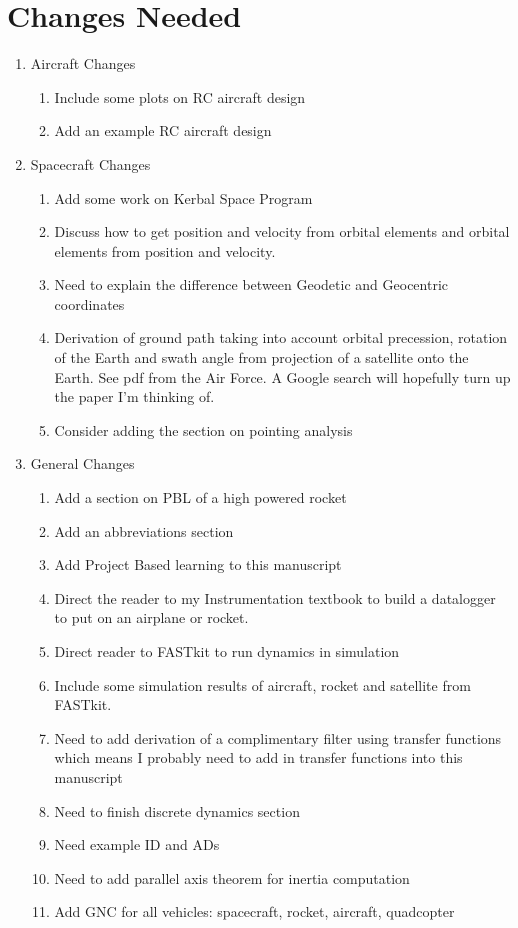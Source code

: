 \section*{Changes Needed}

\begin{enumerate}[itemsep=-5pt]
  \item Aircraft Changes
    \begin{enumerate}[itemsep=-5pt]
    \item Include some plots on RC aircraft design
    \item Add an example RC aircraft design
    \end{enumerate}
\item Spacecraft Changes
  \begin{enumerate}[itemsep=-5pt]
  \item Add some work on Kerbal Space Program
  \item Discuss how to get position and velocity from orbital elements and orbital elements
    from position and velocity.
  \item Need to explain the difference between Geodetic and Geocentric
    coordinates
  \item Derivation of ground path taking into account orbital
    precession, rotation of the Earth and swath angle from projection of
    a satellite onto the Earth. See pdf from the Air Force. A Google
    search will hopefully turn up the paper I'm thinking of.
  \item Consider adding the section on pointing analysis
  \end{enumerate}
\item General Changes
  \begin{enumerate}[itemsep=-5pt]
  \item Add a section on PBL of a high powered rocket
  \item Add an abbreviations section
  \item Add Project Based learning to this manuscript
  \item Direct the reader to my Instrumentation textbook to build a
    datalogger to put on an airplane or rocket.
  \item Direct reader to FASTkit to run dynamics in simulation
  \item Include some simulation results of aircraft, rocket and
    satellite from FASTkit.
  \item Need to add derivation of a complimentary filter using
    transfer functions which means I probably need to add in transfer
    functions into this manuscript
  \item Need to finish discrete dynamics section
  \item Need example ID and ADs
  \item Need to add parallel axis theorem for inertia computation
  \item Add GNC for all vehicles: spacecraft, rocket, aircraft, quadcopter
  \end{enumerate}
\end{enumerate}

